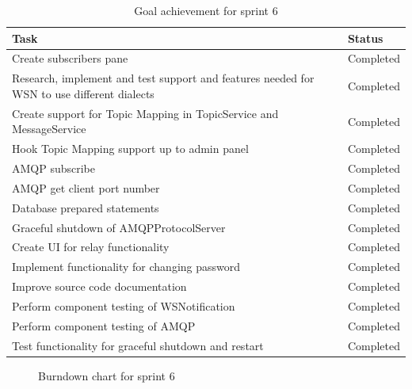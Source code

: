 \begin{table}[ht!]
\small
\centering
\begin{tabular}{ | p{10cm} | p{2cm} |}
\hline
\rowcolor{lightgray}
\textbf{Task} & \textbf{Status} \\
\hline
\rowcolor{green!30}
Create subscribers pane & Completed \\
\rowcolor{green!30}
Research, implement and test support and features needed for WSN to use different dialects & Completed \\
\rowcolor{green!30}
Create support for Topic Mapping in TopicService and MessageService & Completed \\
\rowcolor{green!30}
Hook Topic Mapping support up to admin panel & Completed \\\rowcolor{green!30}
AMQP subscribe & Completed \\
\rowcolor{green!30}
AMQP get client port number & Completed \\
\rowcolor{green!30}
Database prepared statements & Completed \\
\rowcolor{green!30}
Graceful shutdown of AMQPProtocolServer & Completed \\
\rowcolor{green!30}
Create UI for relay functionality & Completed \\
\rowcolor{green!30}
Implement functionality for changing password & Completed \\
\rowcolor{green!30}
Improve source code documentation & Completed \\
\rowcolor{green!30}
Perform component testing of WSNotification & Completed \\
\rowcolor{green!30}
Perform component testing of AMQP & Completed \\
\rowcolor{green!30}
Test functionality for graceful shutdown and restart & Completed \\
\hline
\end{tabular}
\caption{Goal achievement for sprint 6}
\label{tab:sprint 6, goals}
\end{table}

\begin{center}
  \begin{figure}[ht!]
    \caption{Burndown chart for sprint 6}
    \label{fig:sprint 6, burndown}
  \end{figure}
\end{center}

